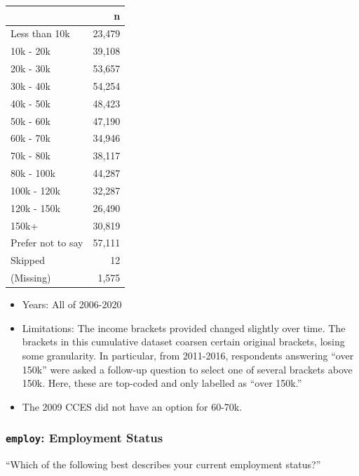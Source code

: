 \documentclass[10pt,article,oneside]{memoir}
\theoremstyle{definition}
\begin{document}
\begin{table}[H]
\centering
\begin{tabular}{lr}
\toprule
 & n\\
\midrule
Less than 10k & 23,479\\
10k - 20k & 39,108\\
20k - 30k & 53,657\\
30k - 40k & 54,254\\
40k - 50k & 48,423\\
50k - 60k & 47,190\\
60k - 70k & 34,946\\
70k - 80k & 38,117\\
80k - 100k & 44,287\\
100k - 120k & 32,287\\
120k - 150k & 26,490\\
150k+ & 30,819\\
Prefer not to say & 57,111\\
Skipped & 12\\
(Missing) & 1,575\\
\bottomrule
\end{tabular}
\end{table}

\begin{itemize}
\tightlist
\item
  Years: All of 2006-2020
\item
  Limitations: The income brackets provided changed slightly over time.
  The brackets in this cumulative dataset coarsen certain original
  brackets, losing some granularity. In particular, from 2011-2016,
  respondents answering ``over 150k'' were asked a follow-up question to
  select one of several brackets above 150k. Here, these are top-coded
  and only labelled as ``over 150k.''
\item
  The 2009 CCES did not have an option for 60-70k.
\end{itemize}

\hypertarget{employ-employment-status}{%
\subsubsection{\texorpdfstring{\texttt{employ}: Employment
Status}{employ: Employment Status}}\label{employ-employment-status}}

``Which of the following best describes your current employment
status?''
\end{document}

